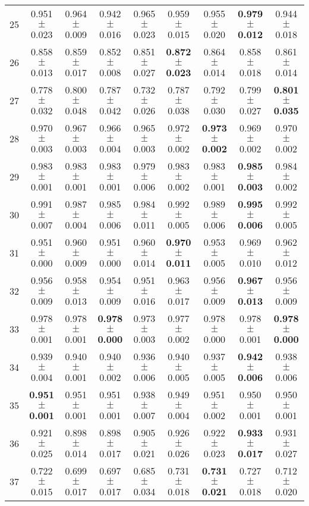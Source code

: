\begin{table}[!ht]
{\begin{tabular}{r c c c c c c c c}
25 & 0.951 $\pm$ 0.023 & 0.964 $\pm$ 0.009 & 0.942 $\pm$ 0.016 & 0.965 $\pm$ 0.023 & 0.959 $\pm$ 0.015 & 0.955 $\pm$ 0.020 & \textbf{0.979 $\pm$ 0.012} & 0.944 $\pm$ 0.018 \\
26 & 0.858 $\pm$ 0.013 & 0.859 $\pm$ 0.017 & 0.852 $\pm$ 0.008 & 0.851 $\pm$ 0.027 & \textbf{0.872 $\pm$ 0.023} & 0.864 $\pm$ 0.014 & 0.858 $\pm$ 0.018 & 0.861 $\pm$ 0.014 \\
27 & 0.778 $\pm$ 0.032 & 0.800 $\pm$ 0.048 & 0.787 $\pm$ 0.042 & 0.732 $\pm$ 0.026 & 0.787 $\pm$ 0.038 & 0.792 $\pm$ 0.030 & 0.799 $\pm$ 0.027 & \textbf{0.801 $\pm$ 0.035} \\
28 & 0.970 $\pm$ 0.003 & 0.967 $\pm$ 0.003 & 0.966 $\pm$ 0.004 & 0.965 $\pm$ 0.003 & 0.972 $\pm$ 0.002 & \textbf{0.973 $\pm$ 0.002} & 0.969 $\pm$ 0.002 & 0.970 $\pm$ 0.002 \\
29 & 0.983 $\pm$ 0.001 & 0.983 $\pm$ 0.001 & 0.983 $\pm$ 0.001 & 0.979 $\pm$ 0.006 & 0.983 $\pm$ 0.002 & 0.983 $\pm$ 0.001 & \textbf{0.985 $\pm$ 0.003} & 0.984 $\pm$ 0.002 \\
30 & 0.991 $\pm$ 0.007 & 0.987 $\pm$ 0.004 & 0.985 $\pm$ 0.006 & 0.984 $\pm$ 0.011 & 0.992 $\pm$ 0.005 & 0.989 $\pm$ 0.006 & \textbf{0.995 $\pm$ 0.006} & 0.992 $\pm$ 0.005 \\
31 & 0.951 $\pm$ 0.000 & 0.960 $\pm$ 0.009 & 0.951 $\pm$ 0.000 & 0.960 $\pm$ 0.014 & \textbf{0.970 $\pm$ 0.011} & 0.953 $\pm$ 0.005 & 0.969 $\pm$ 0.010 & 0.962 $\pm$ 0.012 \\
32 & 0.956 $\pm$ 0.009 & 0.958 $\pm$ 0.013 & 0.954 $\pm$ 0.009 & 0.951 $\pm$ 0.016 & 0.963 $\pm$ 0.017 & 0.956 $\pm$ 0.009 & \textbf{0.967 $\pm$ 0.013} & 0.956 $\pm$ 0.009 \\
33 & 0.978 $\pm$ 0.001 & 0.978 $\pm$ 0.001 & \textbf{0.978 $\pm$ 0.000} & 0.973 $\pm$ 0.003 & 0.977 $\pm$ 0.002 & 0.978 $\pm$ 0.000 & 0.978 $\pm$ 0.001 & \textbf{0.978 $\pm$ 0.000} \\
34 & 0.939 $\pm$ 0.004 & 0.940 $\pm$ 0.001 & 0.940 $\pm$ 0.002 & 0.936 $\pm$ 0.006 & 0.940 $\pm$ 0.005 & 0.937 $\pm$ 0.005 & \textbf{0.942 $\pm$ 0.006} & 0.938 $\pm$ 0.006 \\
35 & \textbf{0.951 $\pm$ 0.001} & 0.951 $\pm$ 0.001 & 0.951 $\pm$ 0.001 & 0.938 $\pm$ 0.007 & 0.949 $\pm$ 0.004 & 0.951 $\pm$ 0.002 & 0.950 $\pm$ 0.001 & 0.950 $\pm$ 0.001 \\
36 & 0.921 $\pm$ 0.025 & 0.898 $\pm$ 0.014 & 0.898 $\pm$ 0.017 & 0.905 $\pm$ 0.021 & 0.926 $\pm$ 0.026 & 0.922 $\pm$ 0.023 & \textbf{0.933 $\pm$ 0.017} & 0.931 $\pm$ 0.027 \\
37 & 0.722 $\pm$ 0.015 & 0.699 $\pm$ 0.017 & 0.697 $\pm$ 0.017 & 0.685 $\pm$ 0.034 & 0.731 $\pm$ 0.018 & \textbf{0.731 $\pm$ 0.021} & 0.727 $\pm$ 0.018 & 0.712 $\pm$ 0.020 \\

\end{tabular}}
\end{table}
